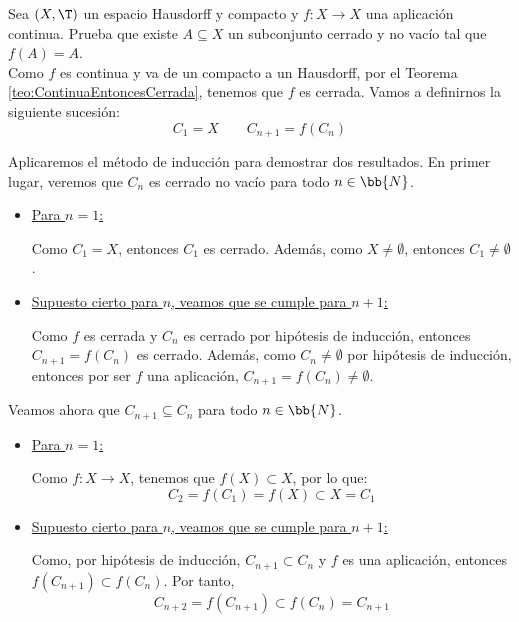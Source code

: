 \begin{ejercicio} \label{ej:4.3.20}
    Sea $(X, \T)$ un espacio Hausdorff y compacto y $f: X \to X$ una aplicación continua. Prueba que existe $A \subseteq X$ un subconjunto cerrado y no vacío tal que $f(A) = A$.\\

    Como $f$ es continua y va de un compacto a un Hausdorff, por el Teorema \ref{teo:ContinuaEntoncesCerrada}, tenemos que $f$ es cerrada. Vamos a definirnos la siguiente sucesión:
    \begin{equation*}
        C_1 = X \qquad C_{n+1} = f(C_n)
    \end{equation*}
    
    Aplicaremos el método de inducción para demostrar dos resultados. En primer lugar, veremos que $C_n$ es cerrado no vacío para todo $n\in \bb{N}$.
    \begin{itemize}
        \item \ul{Para $n=1$:}
        
        Como $C_1=X$, entonces $C_1$ es cerrado. Además, como $X\neq \emptyset$, entonces $C_1\neq \emptyset$.

        \item \ul{Supuesto cierto para $n$, veamos que se cumple para $n+1$:}
        
        Como $f$ es cerrada y $C_n$ es cerrado por hipótesis de inducción, entonces $C_{n+1}=f(C_n)$ es cerrado.
        Además, como $C_n\neq \emptyset$ por hipótesis de inducción, entonces por ser $f$ una aplicación, $C_{n+1}=f(C_n)\neq \emptyset$.
    \end{itemize}

    Veamos ahora que $C_{n+1}\subseteq C_n$ para todo $n\in \bb{N}$.
    \begin{itemize}
        \item \ul{Para $n=1$:}
        
        Como $f:X\to X$, tenemos que $f(X)\subset X$, por lo que: $$C_2=f(C_1)=f(X)\subset X=C_1$$

        \item \ul{Supuesto cierto para $n$, veamos que se cumple para $n+1$:}
        
        Como, por hipótesis de inducción, $C_{n+1}\subset C_n$ y $f$ es una aplicación, entonces $f(C_{n+1})\subset f(C_n)$. Por tanto,
        \begin{equation*}
            C_{n+2} = f(C_{n+1}) \subset f(C_n) = C_{n+1}
        \end{equation*}
    \end{itemize}


\end{ejercicio}
